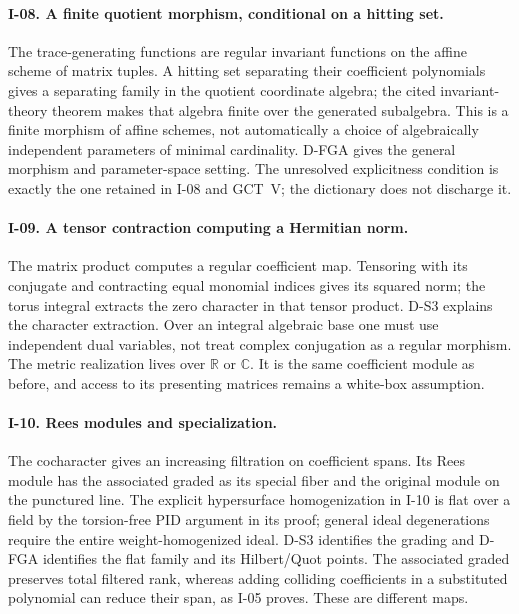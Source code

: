 \paragraph{I-08. A finite quotient morphism, conditional on a hitting set.}
The trace-generating functions are regular invariant functions on the affine scheme of matrix tuples. A hitting set separating their coefficient polynomials gives a separating family in the quotient coordinate algebra; the cited invariant-theory theorem makes that algebra finite over the generated subalgebra. This is a finite morphism of affine schemes, not automatically a choice of algebraically independent parameters of minimal cardinality. D-FGA gives the general morphism and parameter-space setting. The unresolved explicitness condition is exactly the one retained in I-08 and GCT~V; the dictionary does not discharge it.

\paragraph{I-09. A tensor contraction computing a Hermitian norm.}
The matrix product computes a regular coefficient map. Tensoring with its conjugate and contracting equal monomial indices gives its squared norm; the torus integral extracts the zero character in that tensor product. D-S3 explains the character extraction. Over an integral algebraic base one must use independent dual variables, not treat complex conjugation as a regular morphism. The metric realization lives over $\mathbb R$ or $\mathbb C$. It is the same coefficient module as before, and access to its presenting matrices remains a white-box assumption.

\paragraph{I-10. Rees modules and specialization.}
The cocharacter gives an increasing filtration on coefficient spans. Its Rees module has the associated graded as its special fiber and the original module on the punctured line. The explicit hypersurface homogenization in I-10 is flat over a field by the torsion-free PID argument in its proof; general ideal degenerations require the entire weight-homogenized ideal. D-S3 identifies the grading and D-FGA identifies the flat family and its Hilbert/Quot points. The associated graded preserves total filtered rank, whereas adding colliding coefficients in a substituted polynomial can reduce their span, as I-05 proves. These are different maps.


